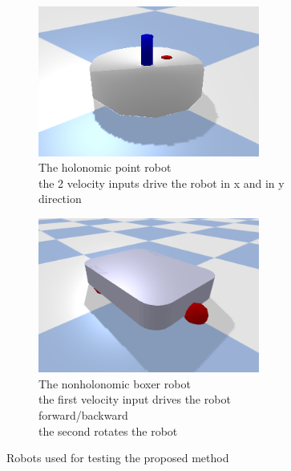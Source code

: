 \begin{figure}[H]
    \centering
    \begin{subfigure}{.5\textwidth}
    \centering
    \includegraphics[width=0.8\textwidth]{figures/point_robot.png}
    \caption{The holonomic point robot\\the 2 velocity inputs drive the robot in \gls{x} and in \gls{y} direction}%
    \label{subfig:example_point_robot}
    \end{subfigure}%
    \begin{subfigure}{.5\textwidth}
    \centering
    \includegraphics[width=0.8\textwidth]{figures/boxer_robot.png}
    \caption{The nonholonomic boxer robot\\the first velocity input drives the robot forward/backward\\the second rotates the robot}%
    \label{subfig:example_boxer_robot}
    \end{subfigure}%
    \caption{Robots used for testing the proposed method}%
    \label{fig:example_robots}
\end{figure}

